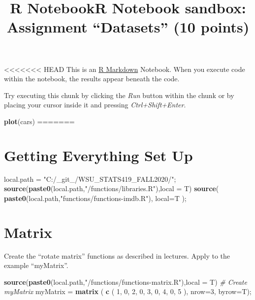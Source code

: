 \documentclass[
]{article}
\title{R Notebook}
\title{R Notebook sandbox: Assignment ``Datasets'' (10 points)}
\author{}
\date{\vspace{-2.5em}}
\newenvironment{Shaded}{\begin{snugshade}}{\end{snugshade}}
\newcommand{\CommentTok}[1]{\textcolor[rgb]{0.56,0.35,0.01}{\textit{#1}}}
\newcommand{\DataTypeTok}[1]{\textcolor[rgb]{0.13,0.29,0.53}{#1}}
\newcommand{\DecValTok}[1]{\textcolor[rgb]{0.00,0.00,0.81}{#1}}
\newcommand{\KeywordTok}[1]{\textcolor[rgb]{0.13,0.29,0.53}{\textbf{#1}}}
\newcommand{\NormalTok}[1]{#1}
\newcommand{\StringTok}[1]{\textcolor[rgb]{0.31,0.60,0.02}{#1}}
\begin{document}
\maketitle

<<<<<<< HEAD
This is an \href{http://rmarkdown.rstudio.com}{R Markdown} Notebook.
When you execute code within the notebook, the results appear beneath
the code.

Try executing this chunk by clicking the \emph{Run} button within the
chunk or by placing your cursor inside it and pressing
\emph{Ctrl+Shift+Enter}.

\begin{Shaded}
\begin{Highlighting}[]
\KeywordTok{plot}\NormalTok{(cars)}
=======
\hypertarget{getting-everything-set-up}{%
\section{Getting Everything Set Up}\label{getting-everything-set-up}}

\begin{Shaded}
\begin{Highlighting}[]
\NormalTok{local.path =}\StringTok{ "C:/_git_/WSU_STATS419_FALL2020/"}\NormalTok{;}
\KeywordTok{source}\NormalTok{(}\KeywordTok{paste0}\NormalTok{(local.path,}\StringTok{"/functions/libraries.R"}\NormalTok{),}\DataTypeTok{local =}\NormalTok{ T)}
\KeywordTok{source}\NormalTok{( }\KeywordTok{paste0}\NormalTok{(local.path,}\StringTok{"functions/functions-imdb.R"}\NormalTok{), }\DataTypeTok{local=}\NormalTok{T );}
\end{Highlighting}
\end{Shaded}

\hypertarget{matrix}{%
\section{Matrix}\label{matrix}}

Create the ``rotate matrix'' functions as described in lectures. Apply
to the example ``myMatrix''.

\begin{Shaded}
\begin{Highlighting}[]
\KeywordTok{source}\NormalTok{(}\KeywordTok{paste0}\NormalTok{(local.path,}\StringTok{"/functions/functions-matrix.R"}\NormalTok{),}\DataTypeTok{local =}\NormalTok{ T)}
\CommentTok{# Create myMatrix}
\NormalTok{myMatrix =}\StringTok{ }\KeywordTok{matrix}\NormalTok{ ( }\KeywordTok{c}\NormalTok{ (}
\DecValTok{1}\NormalTok{, }\DecValTok{0}\NormalTok{, }\DecValTok{2}\NormalTok{,}
\DecValTok{0}\NormalTok{, }\DecValTok{3}\NormalTok{, }\DecValTok{0}\NormalTok{,}
\DecValTok{4}\NormalTok{, }\DecValTok{0}\NormalTok{, }\DecValTok{5}
\NormalTok{), }\DataTypeTok{nrow=}\DecValTok{3}\NormalTok{,}
\DataTypeTok{byrow=}\NormalTok{T);}


\end{Highlighting}
\end{Shaded}
\end{Highlighting}
\end{Shaded}
\end{document}
